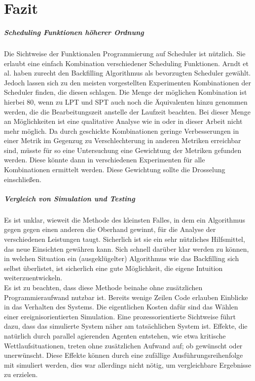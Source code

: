 \chapter{Fazit}

\paragraph{Scheduling Funktionen höherer Ordnung}
Die Sichtweise der Funktionalen Programmierung auf Scheduler ist nützlich. Sie erlaubt eine einfach Kombination verschiedener Scheduling Funktionen. Arndt et al. \cite{Arn99} haben zurecht den Backfilling Algorithmus als bevorzugten Scheduler gewählt. Jedoch lassen sich zu den meisten vorgestellten Experimenten Kombinationen der Scheduler finden, die diesen schlagen. Die Menge der möglichen Kombination ist hierbei 80, wenn zu LPT und SPT auch noch die Äquivalenten hinzu genommen werden, die die Bearbeitungszeit anstelle der Laufzeit beachten. Bei dieser Menge an Möglichkeiten ist eine qualitative Analyse wie in \cite{Arn99} oder in dieser Arbeit nicht mehr möglich. Da durch geschickte Kombinationen geringe Verbesserungen in einer Metrik im Gegenzug zu Verschlechterung in anderen Metriken erreichbar sind, müsste für so eine Untersuchung eine Gewichtung der Metriken gefunden werden. Diese könnte dann in verschiedenen Experimenten für alle Kombinationen ermittelt werden. Diese Gewichtung sollte die Drosselung einschließen.


\paragraph{Vergleich von Simulation und Testing}
Es ist unklar, wieweit die Methode des kleinsten Falles, in dem ein Algorithmus gegen gegen einen anderen die Oberhand gewinnt, für die Analyse der verschiedenen Leistungen taugt. Sicherlich ist sie ein sehr nützliches Hilfsmittel, das neue Einsichten gewähren kann. Sich schnell darüber klar werden zu können, in welchen Situation ein (ausgeklügelter) Algorithmus wie das Backfilling sich selbst überlistet, ist sicherlich eine gute Möglichkeit, die eigene Intuition weiterzuentwickeln.\\
Es ist zu beachten, dass diese Methode beinahe ohne zusätzlichen Programmieraufwand nutzbar ist. Bereits wenige Zeilen Code erlauben Einblicke in das Verhalten des Systems. Die eigentlichen Kosten dafür sind das Wählen einer ereignisorientierten Simulation. Eine prozessorientierte Sichtweise führt dazu, dass das simulierte System näher am tatsächlichen System ist. Effekte, die natürlich durch parallel agierenden Agenten entstehen, wie etwa kritische Wettlaufsituationen, treten ohne zusätzlichen Aufwand auf; ob gewünscht oder unerwünscht. Diese Effekte können durch eine zufällige Ausführungsreihenfolge mit simuliert werden, dies war allerdings nicht nötig, um vergleichbare Ergebnisse zu erzielen.

